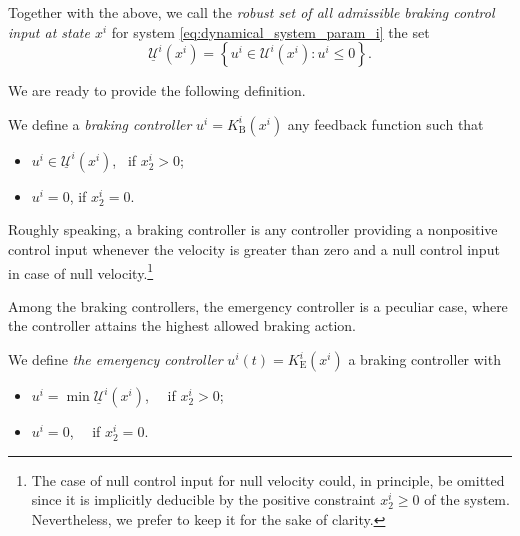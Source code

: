 Together with the above, we call the {\em robust set of all admissible braking control input at state $x^i$} for system \eqref{eq:dynamical_system_param_i} the set
\begin{equation}\label{eq:admissible_braking_inputs}
	\underline{\mathcal{U}}^i(x^i)=\left\{u^i\in\mathcal{U}^i(x^i): u^i\leq 0 \right\}.
\end{equation}

We are ready to provide the following definition.
\begin{definitionNoPoint}
	We define a {\em braking  controller} $u^i= K^i_\mathrm{B}(x^i)$ any feedback function such that
	\begin{itemize}
		\item $u^i \in \underline{\mathcal{U}}^i(x^i)$, \, \quad if $x_2^i >0$;
		\item $u^i=0$, \qquad \quad \; if $x_2^i =0$.
	\end{itemize} 
\end{definitionNoPoint}


Roughly speaking, a braking controller is any controller providing a nonpositive control input whenever the velocity is greater than zero and a null control input in case of null velocity.\footnote{The case of null control input for null velocity could, in principle, be omitted since it is implicitly deducible by the positive constraint $x_2^i\geq 0$ of the system. Nevertheless, we prefer to keep it for the sake of clarity.}

Among the braking  controllers, the emergency controller is a peculiar case, where the controller attains the highest allowed braking  action.

\begin{definitionNoPoint}\label{def:emergency_controller}
	We define  {\em the emergency controller} $u^i(t)= K^i_\mathrm{E}(x^i)$ a braking  controller with
	\begin{itemize}
		\item $u^i = \min \underline{\mathcal{U}}^i(x^i)$, \, \, \quad if $x_2^i >0$;
		\item $u^i=0$, \qquad \qquad \quad \, \, if $x_2^i =0$.
	\end{itemize} 
\end{definitionNoPoint}



